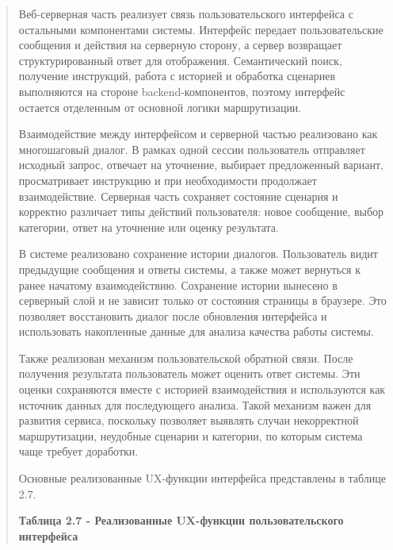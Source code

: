 \documentclass[
]{article}
\begin{document}
\begin{quote}
Веб-серверная часть реализует связь пользовательского интерфейса с
остальными компонентами системы. Интерфейс передает пользовательские
сообщения и действия на серверную сторону, а сервер возвращает
структурированный ответ для отображения. Семантический поиск, получение
инструкций, работа с историей и обработка сценариев выполняются на
стороне backend-компонентов, поэтому интерфейс остается отделенным от
основной логики маршрутизации.

Взаимодействие между интерфейсом и серверной частью реализовано как
многошаговый диалог. В рамках одной сессии пользователь отправляет
исходный запрос, отвечает на уточнение, выбирает предложенный вариант,
просматривает инструкцию и при необходимости продолжает взаимодействие.
Серверная часть сохраняет состояние сценария и корректно различает типы
действий пользователя: новое сообщение, выбор категории, ответ на
уточнение или оценку результата.

В системе реализовано сохранение истории диалогов. Пользователь видит
предыдущие сообщения и ответы системы, а также может вернуться к ранее
начатому взаимодействию. Сохранение истории вынесено в серверный слой и
не зависит только от состояния страницы в браузере. Это позволяет
восстановить диалог после обновления интерфейса и использовать
накопленные данные для анализа качества работы системы.

Также реализован механизм пользовательской обратной связи. После
получения результата пользователь может оценить ответ системы. Эти
оценки сохраняются вместе с историей взаимодействия и используются как
источник данных для последующего анализа. Такой механизм важен для
развития сервиса, поскольку позволяет выявлять случаи некорректной
маршрутизации, неудобные сценарии и категории, по которым система чаще
требует доработки.

Основные реализованные UX-функции интерфейса представлены в таблице 2.7.

\textbf{Таблица 2.7 - Реализованные UX-функции пользовательского
интерфейса}
\end{quote}
\end{document}
